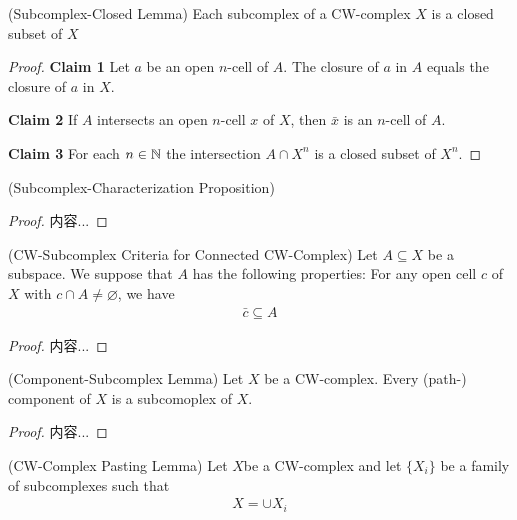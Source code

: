 \documentclass[Total.tex]{subfiles}
\begin{document}
		\begin{lemma}
			(Subcomplex-Closed Lemma) Each subcomplex of a CW-complex $X$ is a closed subset of $X$
		\end{lemma}
		\begin{proof}
			\textbf{Claim 1} Let $a$ be an open $n$-cell of $A$. The closure of $a$ in $A$ equals the closure of $a$ in $X$.
			
			\textbf{Claim 2} If $A$ intersects an open $n$-cell $x$ of $X$, then $\bar{x}$ is an $n$-cell of $A$.
			
			\textbf{Claim 3} For each $n\in \mathbb{N}$ the intersection $A\cap X^n$ is a closed subset of $X^n$.
		\end{proof}
		\begin{proposition}
			(Subcomplex-Characterization Proposition)
		\end{proposition}
		\begin{proof}
			内容...
		\end{proof}
		
		\begin{proposition}
			(CW-Subcomplex Criteria for Connected CW-Complex) Let $A\subseteq X$ be a subspace. We suppose that $A$ has the following properties: For any open cell $c$ of $X$ with $c\cap A\not=\varnothing$, we have
			\begin{gather*}
				\bar{c}\subseteq A
			\end{gather*} 
			
		\end{proposition}
		\begin{proof}
			内容...
		\end{proof}
		
		\begin{proposition}
			(Component-Subcomplex Lemma) Let $X$ be a CW-complex. Every (path-) component of $X$ is a subcomoplex of $X$.
		\end{proposition}
		\begin{proof}
			内容...
		\end{proof}
		
		\begin{proposition}
			(CW-Complex Pasting Lemma) Let $X$be a CW-complex and let $\{X_i\}$ be a family of subcomplexes such that
			\begin{gather*}
				X=\cup X_i
			\end{gather*}
		\end{proposition}
\end{document}
